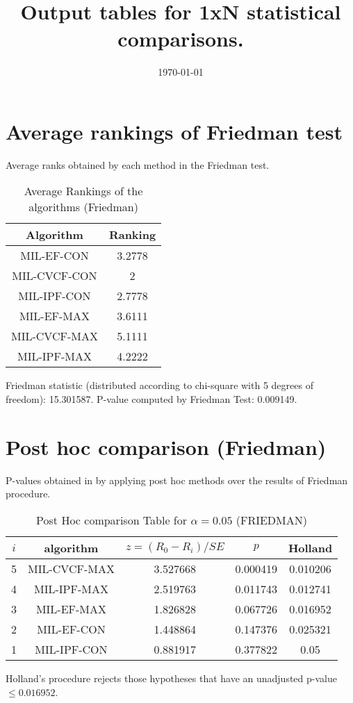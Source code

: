 \documentclass[a4paper,10pt]{article}
\title{Output tables for 1xN statistical comparisons.}
\author{}
\date{\today}
\begin{document}
\begin{landscape}
\pagestyle{empty}
\maketitle
\thispagestyle{empty}

\section{Average rankings of Friedman test}


Average ranks obtained by each method in the Friedman test.

\begin{table}[!htp]
\centering
\begin{tabular}{|c|c|}\hline
Algorithm&Ranking\\\hline
MIL-EF-CON&3.2778\\MIL-CVCF-CON&2\\MIL-IPF-CON&2.7778\\MIL-EF-MAX&3.6111\\MIL-CVCF-MAX&5.1111\\MIL-IPF-MAX&4.2222\\\hline\end{tabular}
\caption{Average Rankings of the algorithms (Friedman)}
\end{table}

Friedman statistic (distributed according to chi-square with 5 degrees of freedom): 15.301587. \newline P-value computed by Friedman Test: 0.009149.\newline


\newpage

\section{Post hoc comparison (Friedman)}


P-values obtained in by applying post hoc methods over the results of Friedman procedure.

\begin{table}[!htp]
\centering\footnotesize
\begin{tabular}{ccccc}
$i$&algorithm&$z=(R_0 - R_i)/SE$&$p$&Holland\\
\hline5&MIL-CVCF-MAX&3.527668&0.000419&0.010206\\4&MIL-IPF-MAX&2.519763&0.011743&0.012741\\3&MIL-EF-MAX&1.826828&0.067726&0.016952\\2&MIL-EF-CON&1.448864&0.147376&0.025321\\1&MIL-IPF-CON&0.881917&0.377822&0.05\\\hline
\end{tabular}
\caption{Post Hoc comparison Table for $\alpha=0.05$ (FRIEDMAN)}
\end{table}Holland's procedure rejects those hypotheses that have an unadjusted p-value $\le0.016952$.



\end{landscape}
\end{document}
